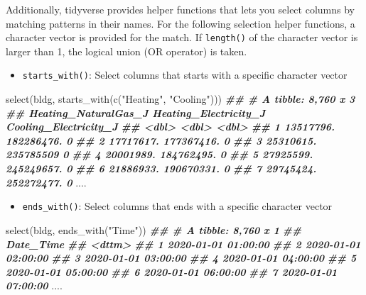 \documentclass[
]{book}
\newenvironment{Shaded}{\begin{snugshade}}{\end{snugshade}}
\newcommand{\DocumentationTok}[1]{\textcolor[rgb]{0.56,0.35,0.01}{\textbf{\textit{#1}}}}
\newcommand{\FunctionTok}[1]{\textcolor[rgb]{0.00,0.00,0.00}{#1}}
\newcommand{\NormalTok}[1]{#1}
\newcommand{\StringTok}[1]{\textcolor[rgb]{0.31,0.60,0.02}{#1}}
\providecommand{\tightlist}{%
  \setlength{\itemsep}{0pt}\setlength{\parskip}{0pt}}
\begin{document}
Additionally, tidyverse provides helper functions that lets you select columns by matching patterns in their names. For the following selection helper functions, a character vector is provided for the match. If \texttt{length()} of the character vector is larger than 1, the logical union (OR \texttt{\textbar{}} operator) is taken.

\begin{itemize}
\tightlist
\item
  \texttt{starts\_with()}: Select columns that starts with a specific character vector
\end{itemize}

\begin{Shaded}
\begin{Highlighting}[]
\FunctionTok{select}\NormalTok{(bldg, }\FunctionTok{starts\_with}\NormalTok{(}\FunctionTok{c}\NormalTok{(}\StringTok{"Heating"}\NormalTok{, }\StringTok{"Cooling"}\NormalTok{)))}
\DocumentationTok{\#\# \# A tibble: 8,760 x 3}
\DocumentationTok{\#\#    Heating\_NaturalGas\_J Heating\_Electricity\_J Cooling\_Electricity\_J}
\DocumentationTok{\#\#                   \textless{}dbl\textgreater{}                 \textless{}dbl\textgreater{}                 \textless{}dbl\textgreater{}}
\DocumentationTok{\#\#  1            13517796.            182286476.                     0}
\DocumentationTok{\#\#  2            17717617.            177367416.                     0}
\DocumentationTok{\#\#  3            25310615.            235785509                      0}
\DocumentationTok{\#\#  4            20001989.            184762495.                     0}
\DocumentationTok{\#\#  5            27925599.            245249657.                     0}
\DocumentationTok{\#\#  6            21886933.            190670331.                     0}
\DocumentationTok{\#\#  7            29745424.            252272477.                     0}
\NormalTok{....}
\end{Highlighting}
\end{Shaded}

\begin{itemize}
\tightlist
\item
  \texttt{ends\_with()}: Select columns that ends with a specific character vector
\end{itemize}

\begin{Shaded}
\begin{Highlighting}[]
\FunctionTok{select}\NormalTok{(bldg, }\FunctionTok{ends\_with}\NormalTok{(}\StringTok{"Time"}\NormalTok{))}
\DocumentationTok{\#\# \# A tibble: 8,760 x 1}
\DocumentationTok{\#\#    Date\_Time          }
\DocumentationTok{\#\#    \textless{}dttm\textgreater{}             }
\DocumentationTok{\#\#  1 2020{-}01{-}01 01:00:00}
\DocumentationTok{\#\#  2 2020{-}01{-}01 02:00:00}
\DocumentationTok{\#\#  3 2020{-}01{-}01 03:00:00}
\DocumentationTok{\#\#  4 2020{-}01{-}01 04:00:00}
\DocumentationTok{\#\#  5 2020{-}01{-}01 05:00:00}
\DocumentationTok{\#\#  6 2020{-}01{-}01 06:00:00}
\DocumentationTok{\#\#  7 2020{-}01{-}01 07:00:00}
\NormalTok{....}
\end{Highlighting}
\end{Shaded}
\end{document}
